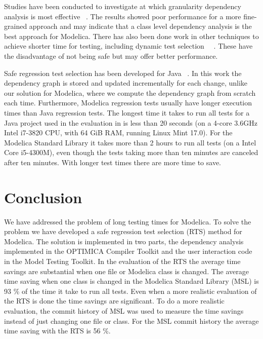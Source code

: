 \documentclass{cslthse-msc}
\begin{document}
Studies have been conducted to investigate at which granularity dependency analysis is most effective ~\cite{DBLP:conf/sigsoft/LegunsenHSLZM16}. The results showed poor performance for a more fine-grained approach and may indicate that a class level dependency analysis is the best approach for Modelica. There has also been done work in other techniques to achieve shorter time for testing, including dynamic test selection ~\cite{DBLP:journals/tse/RothermelH96}~\cite{DBLP:conf/issta/GligoricEM15}. These have the disadvantage of not being safe but may offer better performance. 

Safe regression test selection has been developed for Java ~\cite{DBLP:conf/pppj/OqvistHM16}. In this work the dependency graph is stored and updated incrementally for each change, unlike our solution for Modelica, where we compute the dependency graph from scratch each time. Furthermore, Modelica regression tests usually have longer execution times than Java regression tests. The longest time it takes to run all tests for a Java project used in the evaluation in \cite{DBLP:conf/pppj/OqvistHM16} is less than 20 seconds (on a 4-core 3.6GHz Intel i7-3820 CPU, with 64 GiB RAM, running Linux Mint 17.0). For the Modelica Standard Library it takes more than 2 hours to run all tests (on a Intel Core i5-4300M), even though the tests taking more than ten minutes are canceled after ten minutes. With longer test times there are more time to save.

\chapter[Conclusion]{Conclusion}
We have addressed the problem of long testing times for Modelica. To solve the problem we have developed a safe regression test selection (RTS) method for Modelica. The solution is implemented in two parts, the dependency analysis implemented in the OPTIMICA Compiler Toolkit and the user interaction code in the Model Testing Toolkit. In the evaluation of the RTS the average time savings are substantial when one file or Modelica class is changed. The average time saving when one class is changed in the Modelica Standard Library (MSL) is 93 \% of the time it take to run all tests. Even when a more realistic evaluation of the RTS is done the time savings are significant. To do a more realistic evaluation, the commit history of MSL was used to measure the time savings instead of just changing one file or class. For the MSL commit history the average time saving with the RTS is 56 \%.
\end{document}
